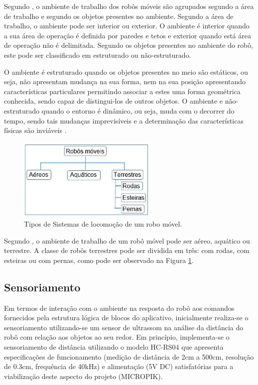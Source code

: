Segundo , o ambiente de trabalho dos robôs móveis são agrupados segundo a área de trabalho e segundo os objetos
presentes no ambiente. Segundo a área de trabalho, o ambiente pode ser interior ou exterior. O ambiente é interior quando a sua
área de operação é definida por paredes e tetos e exterior quando está área de operação não é delimitada. Segundo os objetos
presentes no ambiente do robô, este pode ser classificado em estruturado ou não-estruturado.

O ambiente é estruturado quando os objetos presentes no meio são estáticos, ou seja, não apresentam mudança na sua forma, nem na
sua posição apresentando características particulares permitindo associar a estes uma forma geométrica conhecida, sendo capaz de
distingui-los de outros objetos. O ambiente e não-estruturado quando o entorno é dinâmico, ou seja, muda com o decorrer do
tempo, sendo tais mudanças imprevisíveis e a determinação das características físicas são inviáveis \cite{secchi:2008}.

\begin{figure}[H]
    \centering
    \includegraphics[width=0.6\textwidth]{figuras/locomocao.eps}
    \caption{Tipos de Sistemas de locomoção de um robo móvel.}
    \label{fig:locomocao}
\end{figure}

Segundo , o ambiente de trabalho de um robô móvel pode ser aéreo, aquático ou terrestre. A classe de robôs
terrestres pode ser dividida em três: com rodas, com esteiras ou com pernas, como pode ser observado na Figura \ref{fig:locomocao}.

\subsection{Sensoriamento}

Em termos de interação com o ambiente na resposta do robô aos comandos fornecidos pela estrutura lógica de blocos do aplicativo, inicialmente realiza-se o sensoriamento utilizando-se um sensor de ultrassom na análise da distância do robô com relação aos objetos ao seu redor. Em princípio, implementa-se o sensoriamento de distância utilizando o modelo HC-RS04 que apresenta especificações de funcionamento (medição de distância de 2cm a 500cm, resolução de 0.3cm, frequência de 40kHz) e alimentação (5V DC) satisfatórias para a viabilização deste aspecto do projeto (MICROPIK).

